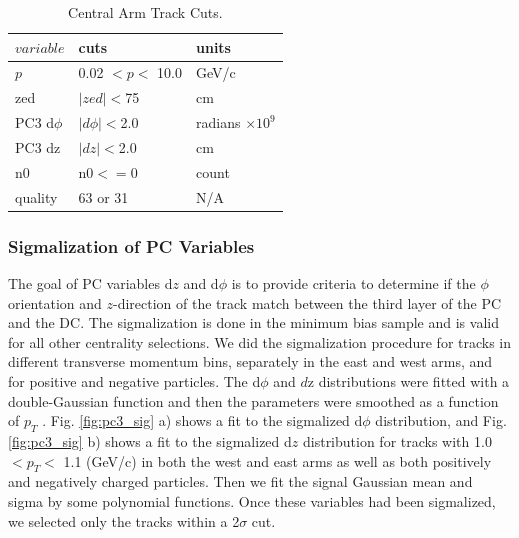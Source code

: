 \begin{table}[h!]
\caption{Central Arm Track Cuts.}
\begin{center}
    \begin{tabular}{| l | l | l | }
    \hline
    $variable$ & cuts  & units\\ \hline
    $p$ & 0.02 $< p < $ 10.0  & GeV/c\\ \hline
    zed & $|zed| <$75  & cm \\ \hline
    PC3 d$\phi$ & $|d\phi|<$2.0  & radians $\times10^{9}$ \\ \hline
    PC3 dz & $|dz|<$2.0 & cm \\ \hline
    n0 & n0$<=$0 & count \\ \hline
    quality & 63 or 31& N/A \\ \hline
    \end{tabular}
\end{center}
\end{table}

\subsubsection{Sigmalization of PC Variables}
\label{sec:pc_sigmala}
The goal of PC variables d$z$ and d$\phi$ is to provide criteria to determine if the $\phi$ orientation and $z$-direction of the track match between the third layer of the PC and the DC. The sigmalization is done in the minimum bias sample and is valid for all other centrality selections.
We did the sigmalization procedure for tracks in different transverse momentum bins, separately in the east
and west arms, and for positive and negative particles. The d$\phi$ and $d$z distributions
were fitted with a double-Gaussian function and then the parameters were smoothed as
a function of $p_T$ . Fig. \ref{fig:pc3_sig} a) shows a fit to the sigmalized
d$\phi$ distribution, and Fig. \ref{fig:pc3_sig} b) shows a fit to the sigmalized d$z$ distribution for tracks with 1.0 $< p_T <$ 1.1 (GeV/c)
in both the west and east arms as well as both positively and negatively charged particles.
Then we fit the signal Gaussian mean and sigma by some polynomial functions.  Once these variables had been sigmalized, we selected only
the tracks within a 2$\sigma$ cut.

